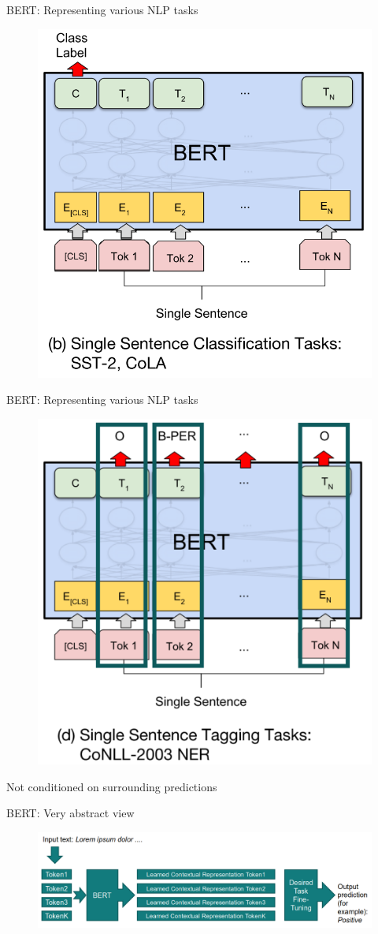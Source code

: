 \documentclass[12pt,aspectratio=169,handout]{beamer}
\begin{document}
\begin{frame}{BERT: Representing various NLP tasks}
	
	\begin{figure}
		\includegraphics[width=0.6\linewidth]{img/task2.png}
	\end{figure}
	
	
\end{frame}



\begin{frame}{BERT: Representing various NLP tasks}
	
	\begin{figure}
		\includegraphics[width=0.5\linewidth]{img/task3.png}
	\end{figure}
	
	
	Not conditioned on surrounding predictions	
	
\end{frame}

\begin{frame}{BERT: Very abstract view}
	
	\begin{figure}
		\includegraphics[width=\linewidth]{img/bert1.png}
	\end{figure}	
	
\end{frame}
\end{document}
